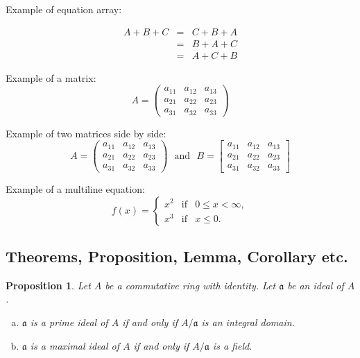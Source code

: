 \documentclass[11pt,leqno]{amsart}
\numberwithin{equation}{subsection}
\newtheorem{proposition}[equation]{Proposition}
\theoremstyle{definition}
\begin{document}
\noindent
Example of equation array: 

\begin{eqnarray}
A + B + C & = & C + B + A \nonumber \\ 
& = & B + A + C  \\ 
& = & A + C + B \nonumber
\end{eqnarray}

\noindent
Example of a matrix: 
\begin{equation}
A = \begin{pmatrix}
a_{11} & a_{12} & a_{13} \\ 
a_{21} & a_{22} & a_{23} \\ 
a_{31} & a_{32} & a_{33} 
\end{pmatrix} 
\end{equation}

\noindent
Example of two matrices side by side: 
\begin{equation}
A = \begin{pmatrix}
a_{11} & a_{12} & a_{13} \\ 
a_{21} & a_{22} & a_{23} \\ 
a_{31} & a_{32} & a_{33} 
\end{pmatrix} 
\ \ \ \text{and}\ \ \ 
B = \begin{bmatrix}
a_{11} & a_{12} & a_{13} \\ 
a_{21} & a_{22} & a_{23} \\ 
a_{31} & a_{32} & a_{33} 
\end{bmatrix}
\end{equation}

\noindent
Example of a multiline equation: 
\begin{equation}
f(x) = \left\{\begin{array}{rcl}
x^2 & \mbox{if} & 0 \leq x < \infty, \\ 
x^3 & \mbox{if} & x \leq 0. 
\end{array}\right. 
\end{equation}


\subsection{Theorems, Proposition, Lemma, Corollary etc.}

\begin{proposition}\label{prop-1}
	Let $A$ be a commutative ring with identity. Let $\mathfrak a$ be an ideal of $A$. 
	\begin{enumerate}[(a)]
		\item $\mathfrak a$ is a prime ideal of $A$ if and only if $A/\mathfrak a$ is an integral domain. 
		\item $\mathfrak a$ is a maximal ideal of $A$ if and only if $A/\mathfrak a$ is a field. 
	\end{enumerate}
\end{proposition}
\end{document}
